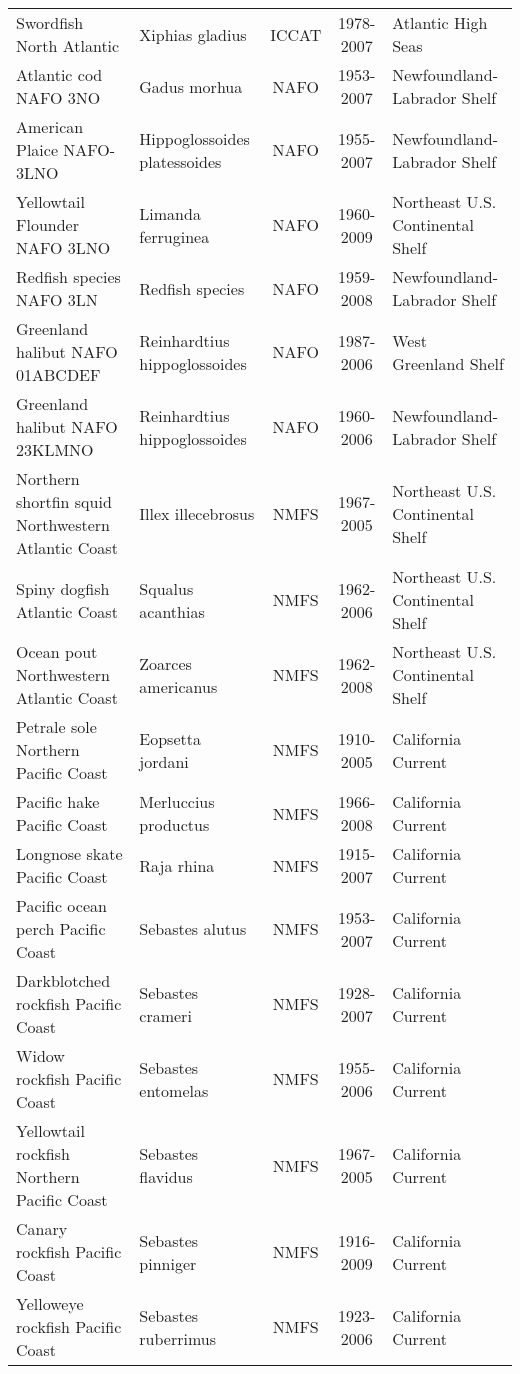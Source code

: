 \begin{longtable}{p{4cm}p{3.5cm}ccp{5.5cm}}
  Swordfish North Atlantic & Xiphias gladius & ICCAT & 1978-2007 & Atlantic High Seas \\ 
  Atlantic cod NAFO 3NO & Gadus morhua & NAFO & 1953-2007 & Newfoundland-Labrador Shelf \\ 
  American Plaice NAFO-3LNO & Hippoglossoides platessoides & NAFO & 1955-2007 & Newfoundland-Labrador Shelf \\ 
  Yellowtail Flounder NAFO 3LNO & Limanda ferruginea & NAFO & 1960-2009 & Northeast U.S. Continental Shelf \\ 
  Redfish species NAFO 3LN & Redfish species & NAFO & 1959-2008 & Newfoundland-Labrador Shelf \\ 
  Greenland halibut NAFO 01ABCDEF & Reinhardtius hippoglossoides & NAFO & 1987-2006 & West Greenland Shelf \\ 
  Greenland halibut NAFO 23KLMNO & Reinhardtius hippoglossoides & NAFO & 1960-2006 & Newfoundland-Labrador Shelf \\ 
  Northern shortfin squid Northwestern Atlantic Coast & Illex illecebrosus & NMFS & 1967-2005 & Northeast U.S. Continental Shelf \\ 
  Spiny dogfish Atlantic Coast & Squalus acanthias & NMFS & 1962-2006 & Northeast U.S. Continental Shelf \\ 
  Ocean pout Northwestern Atlantic Coast & Zoarces americanus & NMFS & 1962-2008 & Northeast U.S. Continental Shelf \\ 
  Petrale sole Northern Pacific Coast & Eopsetta jordani & NMFS & 1910-2005 & California Current \\ 
  Pacific hake Pacific Coast & Merluccius productus & NMFS & 1966-2008 & California Current \\ 
  Longnose skate Pacific Coast & Raja rhina & NMFS & 1915-2007 & California Current \\ 
  Pacific ocean perch Pacific Coast & Sebastes alutus & NMFS & 1953-2007 & California Current \\ 
  Darkblotched rockfish Pacific Coast & Sebastes crameri & NMFS & 1928-2007 & California Current \\ 
  Widow rockfish Pacific Coast & Sebastes entomelas & NMFS & 1955-2006 & California Current \\ 
  Yellowtail rockfish Northern Pacific Coast & Sebastes flavidus & NMFS & 1967-2005 & California Current \\ 
  Canary rockfish Pacific Coast & Sebastes pinniger & NMFS & 1916-2009 & California Current \\ 
  Yelloweye rockfish Pacific Coast & Sebastes ruberrimus & NMFS & 1923-2006 & California Current \\ 

\end{longtable}
